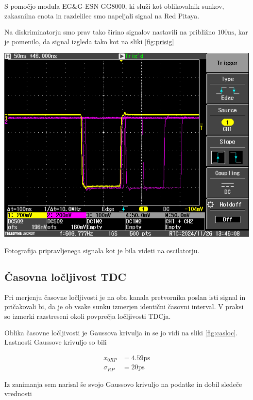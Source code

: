 \documentclass[11pt]{article}
\begin{document}
S pomočjo modula EG\&G-ESN GG8000, ki služi kot oblikovalnik sunkov, zakasnilna enota in razdelilec smo napeljali signal na Red Pitaya.

Na diskriminatorju smo prav tako širino signalov nastavili na približno \(100 \mathrm{ns}\), kar je pomenilo, da signal izgleda tako kot na sliki \ref{fig:prisig}

\begin{slika}[H]
  \centering
  \includegraphics[width=.9\linewidth]{figures/pripravljen_signal.png}
  \caption{\small Fotografija pripravljenega signala kot je bila videti na oscilatorju.}\label{fig:prisig}
\end{slika}

\subsection{Časovna ločljivost TDC}\label{sec:org81fd923}

Pri merjenju časovne ločljivosti je na oba kanala pretvornika poslan isti signal in pričakovali bi, da je ob vsake sunku izmerjen identični časovni interval. V praksi so izmerki razstreseni okoli povprečja ločljivosti TDCja.

Oblika časovne ločljivosti je Gaussova krivulja in se jo vidi na sliki \ref{fig:casloc}. Lastnosti Gaussove krivuljo so bili

\begin{align*}
x_{0RP} &= 4.59 \mathrm{ps} \\
\sigma_{RP} &= 20 \mathrm{ps}
\end{align*}

Iz zanimanja sem narisal še svojo Gaussovo krivuljo na podatke in dobil sledeče vrednosti
\end{document}
